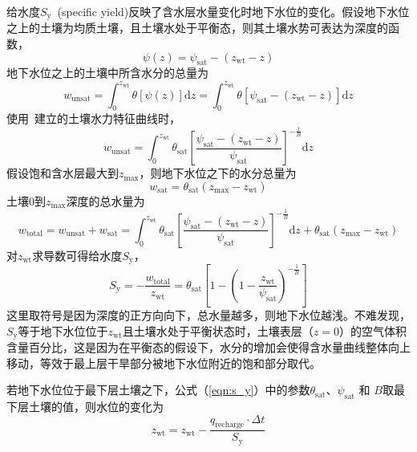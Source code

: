 给水度$S_{\mathrm {y}} $~(specific yield)反映了含水层水量变化时地下水位的变化。假设地下水位之上的土壤为均质土壤，且土壤水处于平衡态，则其土壤水势可表达为深度的函数，
\begin{equation}
  \psi \left(z\right) = \psi_{\mathrm {sat}}  - \left(z_{\mathrm{wt}} - z\right)
\end{equation}
地下水位之上的土壤中所含水分的总量为
\begin{equation}
  w_{\mathrm{unsat}} = \int^{z_{\mathrm{wt}}}_0 \theta\left[\psi\left(z\right)\right] \mathrm{d}z = \int^{z_{\mathrm{wt}}}_0 \theta\left[\psi_{\mathrm {sat}}  - \left(z_{\mathrm{wt}} - z\right)\right] \mathrm{d}z
\end{equation}
使用~\citet{campbell1974}建立的土壤水力特征曲线时，
\begin{equation}
  w_{\mathrm{unsat}} = \int^{z_{\mathrm{wt}}}_0 \theta_{\mathrm {sat}} \left[\frac{\psi_{\mathrm {sat}}  - \left(z_{\mathrm{wt}} - z\right)}{\psi_{\mathrm {sat}} }\right]^{-\frac{1}{B}} \mathrm{d}z
\end{equation}
假设饱和含水层最大到$z_{\mathrm{max}}$，则地下水位之下的水分总量为
\begin{equation}
  w_{\mathrm{sat}} = \theta_{\mathrm {sat}} \left(z_{\mathrm{max}}-z_{\mathrm{wt}}\right)
\end{equation}
土壤$0$到$z_{\mathrm{max}}$深度的总水量为
\begin{equation}
  w_{\mathrm{total}} = w_{\mathrm{unsat}} + w_{\mathrm{sat}} = \int^{z_{\mathrm{wt}}}_0 \theta_{\mathrm {sat}} \left[\frac{\psi_{\mathrm {sat}}  - \left(z_{\mathrm{wt}} - z\right)}{\psi_{\mathrm {sat}} }\right]^{-\frac{1}{B}} \mathrm{d}z + \theta_{\mathrm {sat}} \left(z_{\mathrm{max}}-z_{\mathrm{wt}}\right)
\end{equation}
对$z_{\mathrm{wt}}$求导数可得给水度$S_{\mathrm {y}} $，
\begin{equation}
  {S}_{\mathrm{{y}}} = -\frac{w_{\mathrm{total}}}{z_{\mathrm{wt}}} = \theta_{\mathrm{sat}}\left[1-\left(1-\frac{z_{\mathrm{w t}}}{\psi_{\mathrm{sat}}}\right)^{-\frac{1}{B}}\right] \label{eqn:s_y}
\end{equation}
这里取符号是因为深度的正方向向下，总水量越多，则地下水位越浅。不难发现，$S_{\mathrm {y}} $等于地下水位位于$z_{\mathrm{wt}}$且土壤水处于平衡状态时，土壤表层（$z=0$）的空气体积含量百分比，这是因为在平衡态的假设下，水分的增加会使得含水量曲线整体向上移动，等效于最上层干旱部分被地下水位附近的饱和部分取代。

若地下水位位于最下层土壤之下，公式（\ref{eqn:s_y}）中的参数$\theta_{\mathrm {sat}} $、$\psi_{\mathrm {sat}} $ 和 $B$取最下层土壤的值，则水位的变化为
\begin{equation}
  z_{\mathrm{w t}}=z_{\mathrm{w t}}-\frac{q_{\mathrm{recharge}} \cdot \Delta t}{S_{\mathrm{y}}}
\end{equation}

